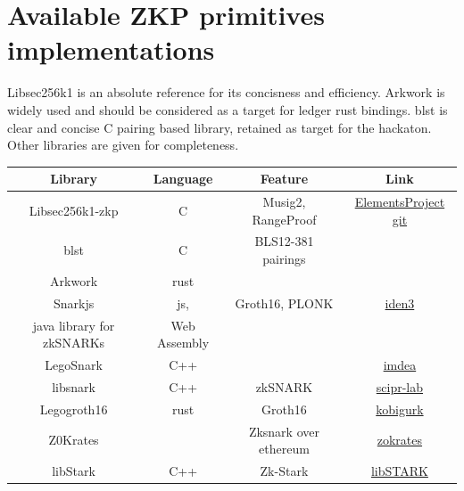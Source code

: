 \documentclass[11pt]{llncs2e/llncs}
\begin{document}
\section{Available ZKP primitives implementations}
Libsec256k1 is an absolute reference for its concisness and efficiency. Arkwork is widely used and should be considered as a target for ledger rust bindings. blst is clear and concise C pairing based library, retained as target for the hackaton. Other libraries are given for completeness. 
% 
 \begin{center}
 \begin{tabular}{|c|c|c|c|}
  \hline
  Library & Language &Feature & Link \\
  \hline
  Libsec256k1-zkp & C &Musig2, RangeProof & \href{https://github.com/ElementsProject/secp256k1-zkp/tree/master/src/modules}{ElementsProject git}\\
  \hline
  blst & C & BLS12-381 pairings & \\
  \hline
  Arkwork & rust & & \\
  \hline
  Snarkjs & js, &Groth16, PLONK& \href{https://github.com/iden3/snarkjs}{iden3}\\
  java library for zkSNARKs &Web Assembly&&\\
  \hline
  LegoSnark & C++ & \cite{LegoSnark} & \href{https://github.com/imdea-software/legosnark}{imdea}\\
  \hline 
  libsnark& C++ & zkSNARK & \href{https://github.com/scipr-lab/libsnark}{scipr-lab}\\
  \hline
Legogroth16& rust & Groth16& \href{https://github.com/kobigurk/legogro16}{kobigurk}\\
\hline
Z0Krates& & Zksnark over ethereum & \href{https://zokrates.github.io/introduction.html}{zokrates}\\ 
\hline
libStark & C++& Zk-Stark & \href{https://github.com/elibensasson/libSTARK}{libSTARK}\\

\hline
 \end{tabular} 
 \end{center}
\end{document}
